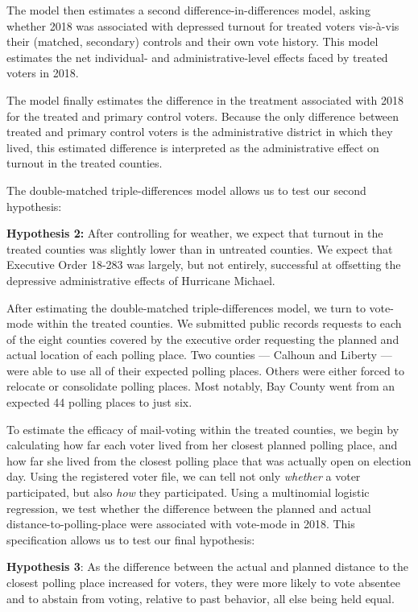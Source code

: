 \documentclass[
  12pt,
]{article}
\begin{document}
The model then estimates a second difference-in-differences model, asking whether 2018 was associated with depressed turnout for treated voters vis-à-vis their (matched, secondary) controls and their own vote history. This model estimates the net individual- and administrative-level effects faced by treated voters in 2018.

The model finally estimates the difference in the treatment associated with 2018 for the treated and primary control voters. Because the only difference between treated and primary control voters is the administrative district in which they lived, this estimated difference is interpreted as the administrative effect on turnout in the treated counties.

The double-matched triple-differences model allows us to test our second hypothesis:

\textbf{Hypothesis 2:} After controlling for weather, we expect that turnout in the treated counties was slightly lower than in untreated counties. We expect that Executive Order 18-283 was largely, but not entirely, successful at offsetting the depressive administrative effects of Hurricane Michael.

After estimating the double-matched triple-differences model, we turn to vote-mode within the treated counties. We submitted public records requests to each of the eight counties covered by the executive order requesting the planned and actual location of each polling place. Two counties --- Calhoun and Liberty --- were able to use all of their expected polling places. Others were either forced to relocate or consolidate polling places. Most notably, Bay County went from an expected 44 polling places to just six.

To estimate the efficacy of mail-voting within the treated counties, we begin by calculating how far each voter lived from her closest planned polling place, and how far she lived from the closest polling place that was actually open on election day. Using the registered voter file, we can tell not only \emph{whether} a voter participated, but also \emph{how} they participated. Using a multinomial logistic regression, we test whether the difference between the planned and actual distance-to-polling-place were associated with vote-mode in 2018. This specification allows us to test our final hypothesis:

\textbf{Hypothesis 3}: As the difference between the actual and planned distance to the closest polling place increased for voters, they were more likely to vote absentee and to abstain from voting, relative to past behavior, all else being held equal.
\end{document}
